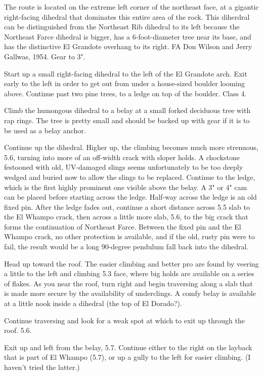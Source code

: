 \documentclass{tahquitz}
\begin{document}
The route is located on the extreme left corner of the northeast
face, at a gigantic right-facing dihedral that dominates this entire area of the
rock. This diherdral can be distinguished from the Northeast Rib dihedral to its left
because the Northeast Farce dihedral is bigger, has a 6-foot-diameter tree near its base,
and has the distinctive El Grandote overhang to its right.
FA Don Wilson and Jerry Gallwas, 1954. Gear to 3".

\somespace

 Start up a small right-facing dihedral to the left of the El Grandote arch.
Exit early to the left in order to get out from under a house-sized boulder
looming above. Continue past two pine trees, to
a ledge on top of the boulder.
Class 4.

 Climb the humongous dihedral to a belay at a small forked deciduous tree with rap
rings. The tree is pretty small and should be backed up with gear if it is to be
used as a belay anchor.

 Continue up the dihedral.
Higher up, the climbing becomes much more strenuous, 5.6, turning
into more of an off-width crack with sloper holds. A chockstone festooned with
old, UV-damaged slings seems unfortunately to be too deeply wedged and buried
now to allow the slings to be replaced. Continue to the ledge, which is the first
highly prominent one visible above the belay. A 3" or 4" cam can be placed before
starting across the ledge. Half-way across the ledge is an old fixed pin. After the
ledge fades out, continue a short distance across 5.5 slab to the El Whampo crack,
then across a little more slab, 5.6, to the big crack that forms the continuation
of Northeast Farce.
Between the fixed pin and the El Whampo crack, no other protection is available,
and if the old, rusty pin were to fail, the result would be a long 90-degree pendulum
fall back into the dihedral.

 Head up toward the roof. The easier climbing and better pro are found
by veering a little to the left and climbing 5.3 face, where big holds are available on a series of flakes.
As you near the roof, turn right and begin traversing
along a slab that is made more secure by the availability of underclings. A comfy
belay is available at a little nook inside a dihedral (the top of El Dorado?).

 Continue traversing and look for a weak spot at which to exit up through the roof. 5.6.

 Exit up and left from the belay, 5.7. Continue either to the right on the layback
that is part of El Whampo (5.7), or up a gully to the left for easier climbing. (I haven't tried
the latter.)
\end{document}
